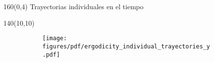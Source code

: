\documentclass[shownotes,aspectratio=169]{beamer}
\begin{document}
\begin{frame}[plain]
\begin{textblock}{160}(0,4)
 \centering \LARGE
Trayectorias individuales en el tiempo
\end{textblock}
\vspace{1cm}

\begin{textblock}{140}(10,10)
\begin{figure}[H]
    \centering
    \begin{subfigure}[b]{0.49\linewidth}
    \texttt{[image: figures/pdf/ergodicity\_individual\_trayectories\_y.pdf]}
    \end{subfigure}
\end{figure}
\end{textblock}



\end{frame}
\end{document}
